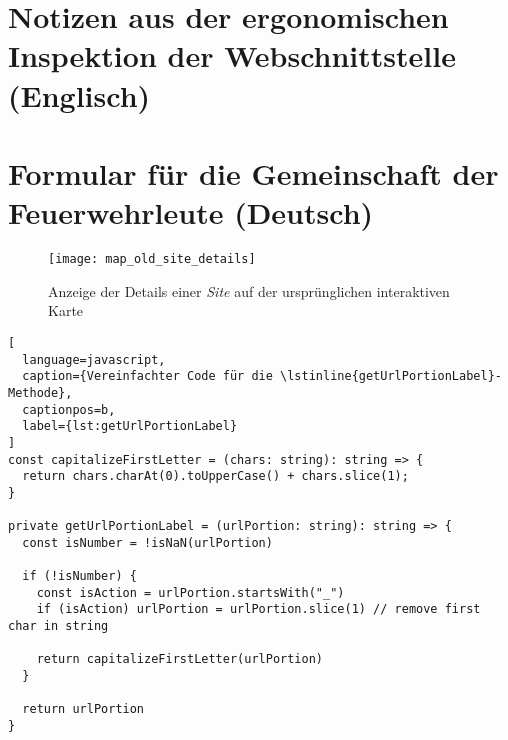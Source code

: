 



\section{Notizen aus der ergonomischen Inspektion der Webschnittstelle (Englisch)} \label{appendix:ergonomic-inspection}



\section{Formular für die Gemeinschaft der Feuerwehrleute (Deutsch)} \label{appendix:firefighter-survey}







\begin{figure}[H]
  \centering
  \texttt{[image: map\_old\_site\_details]}
  \caption{Anzeige der Details einer \textit{Site} auf der ursprünglichen interaktiven Karte}
  \label{fig:map_old_site_details}
\end{figure}



\begin{lstlisting}[
  language=javascript,
  caption={Vereinfachter Code für die \lstinline{getUrlPortionLabel}-Methode},
  captionpos=b,
  label={lst:getUrlPortionLabel}
]
const capitalizeFirstLetter = (chars: string): string => {
  return chars.charAt(0).toUpperCase() + chars.slice(1);
}

private getUrlPortionLabel = (urlPortion: string): string => {
  const isNumber = !isNaN(urlPortion)

  if (!isNumber) {
    const isAction = urlPortion.startsWith("_")
    if (isAction) urlPortion = urlPortion.slice(1) // remove first char in string

    return capitalizeFirstLetter(urlPortion)
  }

  return urlPortion
}
\end{lstlisting}